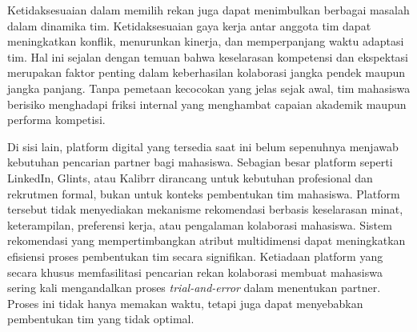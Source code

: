 Ketidaksesuaian dalam memilih rekan juga dapat menimbulkan berbagai masalah dalam dinamika tim. Ketidaksesuaian gaya kerja antar anggota tim dapat meningkatkan konflik, menurunkan kinerja, dan memperpanjang waktu adaptasi tim. Hal ini sejalan dengan temuan \textcite{ensherEffectsPerceivedDiscrimination2001} bahwa keselarasan kompetensi dan ekspektasi merupakan faktor penting dalam keberhasilan kolaborasi jangka pendek maupun jangka panjang. Tanpa pemetaan kecocokan yang jelas sejak awal, tim mahasiswa berisiko menghadapi friksi internal yang menghambat capaian akademik maupun performa kompetisi.

Di sisi lain, platform digital yang tersedia saat ini belum sepenuhnya menjawab kebutuhan pencarian partner bagi mahasiswa. Sebagian besar platform seperti LinkedIn, Glints, atau Kalibrr dirancang untuk kebutuhan profesional dan rekrutmen formal, bukan untuk konteks pembentukan tim mahasiswa. Platform tersebut tidak menyediakan mekanisme rekomendasi berbasis keselarasan minat, keterampilan, preferensi kerja, atau pengalaman kolaborasi mahasiswa. Sistem rekomendasi yang mempertimbangkan atribut multidimensi dapat meningkatkan efisiensi proses pembentukan tim secara signifikan. Ketiadaan platform yang secara khusus memfasilitasi pencarian rekan kolaborasi membuat mahasiswa sering kali mengandalkan proses \textit{trial-and-error} dalam menentukan partner. Proses ini tidak hanya memakan waktu, tetapi juga dapat menyebabkan pembentukan tim yang tidak optimal. 




